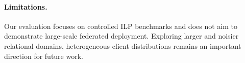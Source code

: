 

\paragraph{Limitations.}
Our evaluation focuses on controlled ILP benchmarks and does not aim to demonstrate large-scale federated deployment. Exploring larger and noisier relational domains, heterogeneous client distributions remains an important direction for future work.

